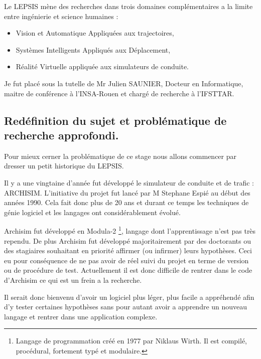 \documentclass[a4paper,11pt]{article}
\begin{document}
Le LEPSIS mène des recherches dans trois domaines complémentaires a la limite entre ingénierie et science humaines : 
\begin{itemize}[label=-]
\vspace{-0.2cm}
\item Vision et Automatique Appliquées aux trajectoires,
\vspace{-0.2cm}
\item Systèmes Intelligents Appliqués aux Déplacement,
\vspace{-0.2cm}
\item Réalité Virtuelle appliquée aux simulateurs de conduite.
\end{itemize}
\vspace{-0.2cm}

Je fut placé sous la tutelle de Mr Julien SAUNIER, Docteur en Informatique, maitre de conférence à l'INSA-Rouen et chargé de recherche à l'IFSTTAR.


\subsection{Redéfinition du sujet et problématique de recherche approfondi.}

Pour mieux cerner la problématique de ce stage nous allons commencer par dresser un petit historique du LEPSIS.

Il y a une vingtaine d'année fut développé le simulateur de conduite et de trafic :  ARCHISIM. L'initiative du projet fut lancé par M Stephane Espié au début des années 1990. Cela fait donc plus de 20 ans et durant ce temps les techniques de génie logiciel et les langages ont considérablement évolué. 

Archisim fut développé en Modula-2 \footnote{Langage de programmation créé en 1977 par Niklaus Wirth. Il est compilé, procédural, fortement typé et modulaire.}, langage dont l'apprentissage n'est pas très rependu. De plus Archisim fut développé majoritairement par des doctorants ou des stagiaires souhaitant en priorité affirmer (ou infirmer) leurs hypothèses. Ceci eu pour conséquence de ne pas avoir de réel suivi du projet en terme de version ou de procédure de test. Actuellement il est donc difficile de rentrer dans le code d'Archisim ce qui est un frein a la recherche. 

Il serait donc bienvenu d'avoir un logiciel plus léger, plus facile a appréhendé afin d'y tester certaines hypothèses sans pour autant avoir a apprendre un nouveau langage et rentrer dans une application complexe.
\end{document}
